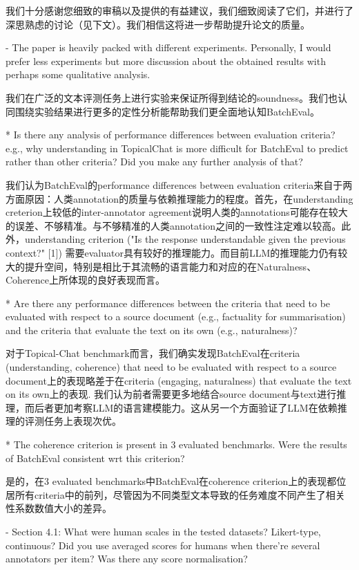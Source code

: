 
我们十分感谢您细致的审稿以及提供的有益建议，我们细致阅读了它们，并进行了深思熟虑的讨论（见下文）。我们相信这将进一步帮助提升论文的质量。

- The paper is heavily packed with different experiments. Personally, I would prefer less experiments but more discussion about the obtained results with perhaps some qualitative analysis.

我们在广泛的文本评测任务上进行实验来保证所得到结论的soundness。我们也认同围绕实验结果进行更多的定性分析能帮助我们更全面地认知BatchEval。

* Is there any analysis of performance differences between evaluation criteria? e.g., why understanding in TopicalChat is more difficult for BatchEval to predict rather than other criteria? Did you make any further analysis of that?

我们认为BatchEval的performance differences between evaluation criteria来自于两方面原因：人类annotation的质量与依赖推理能力的程度。首先，在understanding creterion上较低的inter-annotator agreement说明人类的annotations可能存在较大的误差、不够精准。与不够精准的人类annotation之间的一致性注定难以较高。此外，understanding criterion ("Is the response understandable given the previous context?" [1]) 需要evaluator具有较好的推理能力。而目前LLM的推理能力仍有较大的提升空间，特别是相比于其流畅的语言能力和对应的在Naturalness、Coherence上所体现的良好表现而言。


* Are there any performance differences between the criteria that need to be evaluated with respect to a source document (e.g., factuality for summarisation) and the criteria that evaluate the text on its own (e.g., naturalness)?

对于Topical-Chat benchmark而言，我们确实发现BatchEval在criteria (understanding, coherence) that need to be evaluated with respect to a source document上的表现略差于在criteria (engaging, naturalness) that evaluate the text on its own上的表现. 我们认为前者需要更多地结合source document与text进行推理，而后者更加考察LLM的语言建模能力。这从另一个方面验证了LLM在依赖推理的评测任务上表现次优。

* The coherence criterion is present in 3 evaluated benchmarks. Were the results of BatchEval consistent wrt this criterion?

是的，在3 evaluated benchmarks中BatchEval在coherence criterion上的表现都位居所有criteria中的前列，尽管因为不同类型文本导致的任务难度不同产生了相关性系数数值大小的差异。


- Section 4.1: What were human scales in the tested datasets? Likert-type, continuous? Did you use averaged scores for humans when there're several annotators per item? Was there any score normalisation?

